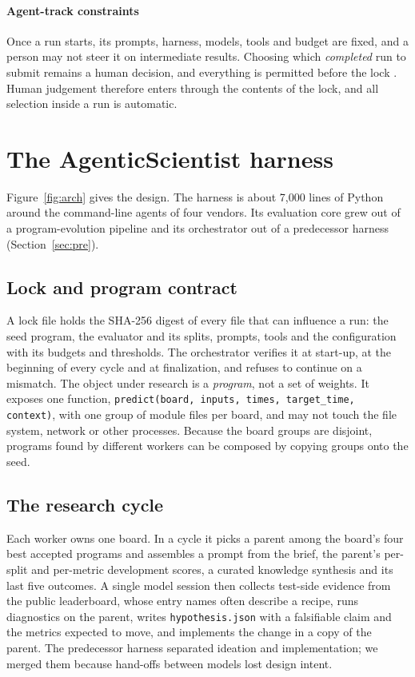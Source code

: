 \documentclass[9pt,twocolumn,a4paper]{extarticle}
\newcommand{\code}[1]{\texttt{\small #1}}
\begin{document}
\paragraph{Agent-track constraints} Once a run starts, its prompts, harness, models, tools and budget are fixed, and
a person may not steer it on intermediate results. Choosing which \emph{completed} run to submit remains a human
decision, and everything is permitted before the lock \cite{vec2026}. Human judgement therefore enters through the
contents of the lock, and all selection inside a run is automatic.

\section{The AgenticScientist harness}

Figure~\ref{fig:arch} gives the design. The harness is about 7,000 lines of Python around the command-line agents of
four vendors. Its evaluation core grew out of a program-evolution pipeline \cite{lange2025shinka} and its
orchestrator out of a predecessor harness (Section~\ref{sec:pre}).

\subsection{Lock and program contract}

A lock file holds the SHA-256 digest of every file that can influence a run: the seed program, the evaluator and its
splits, prompts, tools and the configuration with its budgets and thresholds. The orchestrator verifies it at
start-up, at the beginning of every cycle and at finalization, and refuses to continue on a mismatch. The object
under research is a \emph{program}, not a set of weights. It exposes one function,
\code{predict(board, inputs, times, target\_time, context)}, with one group of module files per board, and may not
touch the file system, network or other processes. Because the board groups are disjoint, programs found by
different workers can be composed by copying groups onto the seed.

\subsection{The research cycle}

Each worker owns one board. In a cycle it picks a parent among the board's four best accepted programs and assembles
a prompt from the brief, the parent's per-split and per-metric development scores, a curated knowledge synthesis and
its last five outcomes. A single model session then collects test-side evidence from the public leaderboard, whose
entry names often describe a recipe, runs diagnostics on the parent, writes \code{hypothesis.json} with a falsifiable
claim and the metrics expected to move, and implements the change in a copy of the parent. The predecessor harness
separated ideation and implementation; we merged them because hand-offs between models lost design intent.
\end{document}
